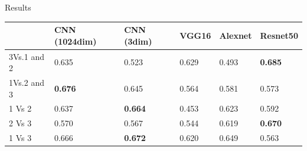 \documentclass[usenames,dvipsnames]{beamer}
\begin{document}
\begin{frame}{Results}
\begin{table}[]
\begin{tabular}{|p{1.5cm}|p{1.4cm}|p{1.3cm}|p{1.3cm}|p{1.3cm}|p{1.3cm}|}
\hline
              & CNN (1024dim)  & CNN (3dim)     & VGG16 & Alexnet & Resnet50       \\ \hline
3Vs.1 and 2 & 0.635          & 0.523          & 0.629 & 0.493  & \textbf{0.685} \\ \hline
1Vs.2 and 3 & \textbf{0.676} & 0.645          & 0.564 & 0.581  & 0.573          \\ \hline
1 Vs 2        & 0.637         & \textbf{0.664} & 0.453 & 0.623   & 0.592         \\ \hline
2 Vs 3        & 0.570          & 0.567          & 0.544 & 0.619   & \textbf{0.670} \\ \hline
1 Vs 3        & 0.666         & \textbf{0.672} & 0.620 & 0.649   & 0.563          \\ \hline
\end{tabular}
\end{table}    



\end{frame}

\end{document}
